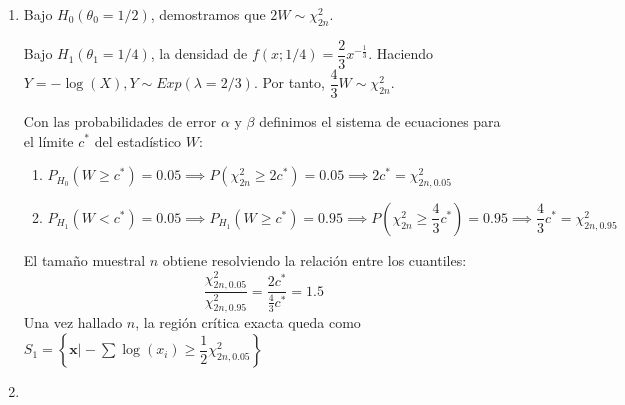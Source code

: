 \begin{enumerate}[label=\color{red}\textbf{\arabic*)}]
\begin{enumerate}[label=\color{red}\textbf{\alph*)}]
		            Haciendo la transformación $Y=-\log(X)$, se obtiene que $Y\sim Exp(\lambda=2)$.

		            El estadístico $W=-\sum_{i=1}^{20}\log(X_i)=\sum_{i=1}^{20} Y_i$ sigue una distribución $Gamma(20,2)$, por lo que $2W\sim \chi_{40}^2$.
		            \begin{enumerate}[label=\arabic*)]
			            \item \textbf{Valor observado:} $\sum \log(x_{i})=-6.21\implies W_{obs}=6.21 \implies 2W_{obs}=12.42$.
			            \item \textbf{$p$-valor:} Como la región de rechazo es $\sum \log(x_{i})\le c$ (equivalentemente $2W\ge c'$), el $p$-valor es la probabilidad de observar un valor máx extremo hacia la región de rechazo: \[
				                  p\text{-valor}=P_{H_0}\left( \sum \log(X_i)\le -6.21 \right) =P(\chi_{40}^2\ge 12.42)
			                  \]
			            \item \textbf{Decisión:} En una $\chi_{40}^2$, la media es 40. Un valor de 12.42 deja casi toda el área a su derecha $(p\approx 0.999)$. Al ser $p$-valor $>\alpha$, \textbf{se acepta $H_0$}.

		            \end{enumerate}
		      \item {}

		            Bajo $H_0(\theta_0=1 / 2)$, demostramos que $2W\sim \chi_{2n}^2$.

		            Bajo $H_1(\theta_1=1 / 4)$, la densidad de $f(x;1 / 4)=\dfrac{2}{3}x^{-\frac{1}{3} }$. Haciendo $Y=-\log(X),Y\sim Exp(\lambda=2 / 3)$. Por tanto, $\dfrac{4}{3}W\sim \chi_{2n}^2$.

		            Con las probabilidades de error $\alpha$ y $\beta$ definimos el sistema de ecuaciones para el límite $c^*$ del estadístico $W$:
		            \begin{enumerate}[label=\arabic*)]
			            \item $P_{H_0}(W\ge c^*)=0.05\implies P(\chi_{2n}^2\ge 2c^*)=0.05\implies 2c^*=\chi_{2n,0.05}^2$
			            \item $P_{H_1}(W<c^*)=0.05\implies P_{H_1}(W\ge c^*)=0.95\implies P\left(\chi_{2n}^2\ge \dfrac{4}{3}c^*\right)=0.95\implies \dfrac{4}{3}c^*=\chi_{2n,0.95}^2$
		            \end{enumerate}
		            El tamaño muestral $n$ obtiene resolviendo la relación entre los cuantiles:  \[
			            \dfrac{\chi_{2n,0.05}^2}{\chi_{2n,0.95}^2}=\dfrac{2c^*}{\frac{4}{3} c^*}=1.5
		            \]
		            Una vez hallado $n$, la región crítica exacta queda como $S_1=\left\{\mathbf{x}\bigg| -\sum \log(x_{i})\ge \dfrac{1}{2}\chi_{2n,0.05}^2\right\} $
		      \item {}


\end{enumerate}
\end{enumerate}
